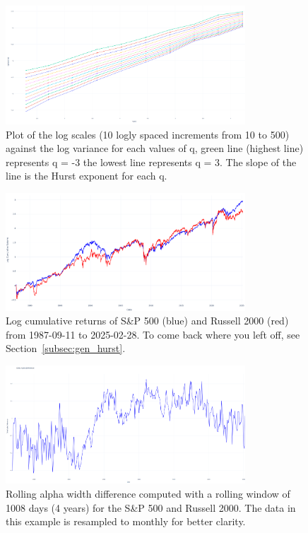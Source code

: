 \documentclass[11pt]{extarticle}
\begin{document}
\begin{figure}[ht]
    \centering
    \includegraphics[width=0.8\textwidth]{img/log_variance_log_scale}
    \caption{Plot of the log scales (10 logly spaced increments from 10 to 500) against the log variance for each values of q, green line (highest line) represents q = -3
    the lowest line represents q = 3. The slope of the line is the Hurst exponent for each q.}
    \label{fig:log_variance_log_scale}
\end{figure}
\FloatBarrier

\begin{figure}[ht]
    \centering
    \includegraphics[width=0.8\textwidth]{img/log_cumulative_returns.png}
    \caption{Log cumulative returns of S\&P 500 (blue) and Russell 2000 (red) from 1987-09-11 to 2025-02-28.
    To come back where you left off, see Section~\ref{subsec:gen_hurst}.}
    \label{fig:cumulative_returns}
\end{figure}


\FloatBarrier


\begin{figure}[ht]
    \centering
    \includegraphics[width=0.8\textwidth]{img/delta_alpha_resample_m.png}
    \caption{Rolling alpha width difference computed with a rolling window of 1008 days (4 years)
        for the S\&P 500 and Russell 2000. The data in this example is resampled to monthly for better clarity.}
    \label{fig:rolling_alpha_width}
\end{figure}
\FloatBarrier
\end{document}
